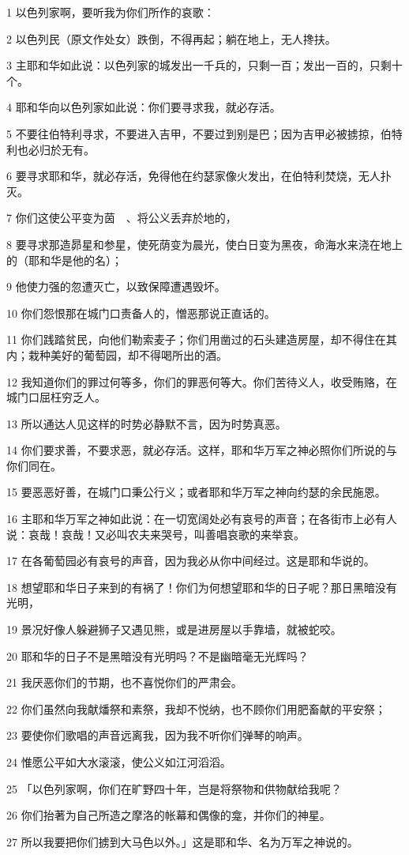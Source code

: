 \par 1 以色列家啊，要听我为你们所作的哀歌：
\par 2 以色列民（原文作处女）跌倒，不得再起；躺在地上，无人搀扶。
\par 3 主耶和华如此说：以色列家的城发出一千兵的，只剩一百；发出一百的，只剩十个。
\par 4 耶和华向以色列家如此说：你们要寻求我，就必存活。
\par 5 不要往伯特利寻求，不要进入吉甲，不要过到别是巴；因为吉甲必被掳掠，伯特利也必归於无有。
\par 6 要寻求耶和华，就必存活，免得他在约瑟家像火发出，在伯特利焚烧，无人扑灭。
\par 7 你们这使公平变为茵　、将公义丢弃於地的，
\par 8 要寻求那造昴星和参星，使死荫变为晨光，使白日变为黑夜，命海水来浇在地上的（耶和华是他的名）；
\par 9 他使力强的忽遭灭亡，以致保障遭遇毁坏。
\par 10 你们怨恨那在城门口责备人的，憎恶那说正直话的。
\par 11 你们践踏贫民，向他们勒索麦子；你们用凿过的石头建造房屋，却不得住在其内；栽种美好的葡萄园，却不得喝所出的酒。
\par 12 我知道你们的罪过何等多，你们的罪恶何等大。你们苦待义人，收受贿赂，在城门口屈枉穷乏人。
\par 13 所以通达人见这样的时势必静默不言，因为时势真恶。
\par 14 你们要求善，不要求恶，就必存活。这样，耶和华万军之神必照你们所说的与你们同在。
\par 15 要恶恶好善，在城门口秉公行义；或者耶和华万军之神向约瑟的余民施恩。
\par 16 主耶和华万军之神如此说：在一切宽阔处必有哀号的声音；在各街市上必有人说：哀哉！哀哉！又必叫农夫来哭号，叫善唱哀歌的来举哀。
\par 17 在各葡萄园必有哀号的声音，因为我必从你中间经过。这是耶和华说的。
\par 18 想望耶和华日子来到的有祸了！你们为何想望耶和华的日子呢？那日黑暗没有光明，
\par 19 景况好像人躲避狮子又遇见熊，或是进房屋以手靠墙，就被蛇咬。
\par 20 耶和华的日子不是黑暗没有光明吗？不是幽暗毫无光辉吗？
\par 21 我厌恶你们的节期，也不喜悦你们的严肃会。
\par 22 你们虽然向我献燔祭和素祭，我却不悦纳，也不顾你们用肥畜献的平安祭；
\par 23 要使你们歌唱的声音远离我，因为我不听你们弹琴的响声。
\par 24 惟愿公平如大水滚滚，使公义如江河滔滔。
\par 25 「以色列家啊，你们在旷野四十年，岂是将祭物和供物献给我呢？
\par 26 你们抬著为自己所造之摩洛的帐幕和偶像的龛，并你们的神星。
\par 27 所以我要把你们掳到大马色以外。」这是耶和华、名为万军之神说的。

